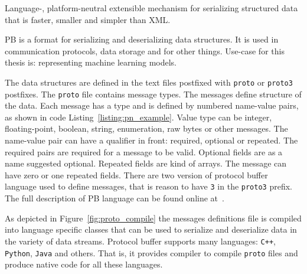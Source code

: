 \documentclass[english, 12pt, a4paper, elec, utf8, online]{aaltothesis}
\begin{document}
\begin{center}
Language-, platform-neutral extensible mechanism for serializing structured data that is faster, smaller and simpler than XML.
\end{center}

PB is a format for serializing and deserializing data structures. It is used in communication protocols, data storage and for other things. Use-case for this thesis is: representing machine learning models. 

The data structures are defined in the text files postfixed with \texttt{proto} or \texttt{proto3} postfixes. The \texttt{proto} file contains message types. The messages define structure of the data. Each message has a type and is defined by numbered name-value pairs, as shown in code Listing~\ref{listing:pn_example}. Value type can be integer, floating-point, boolean, string, enumeration, raw bytes or other messages. The name-value pair can have a qualifier in front: required, optional or repeated. The required pairs are required for a message to be valid. Optional fields are as a name suggested optional. Repeated fields are kind of arrays. The message can have zero or one repeated fields. There are two version of protocol buffer language used to define messages, that is reason to have \texttt{3} in the \texttt{proto3} prefix. The full description of PB language can be found online at~\cite{pb_reference}. 



As depicted in Figure~\ref{fig:proto_compile} the messages definitions file is compiled into language specific classes that can be used to serialize and deserialize data in the variety of data streams. Protocol buffer supports many languages: \texttt{C++}, \texttt{Python}, \texttt{Java} and others. That is, it provides compiler to compile \texttt{proto} files and produce native code for all these languages.
\end{document}
